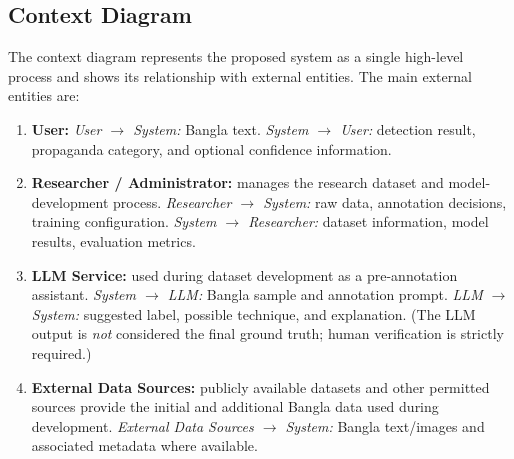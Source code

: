 \subsection{Context Diagram}
The context diagram represents the proposed system as a single high-level process
and shows its relationship with external entities. The main external entities are:
\begin{enumerate}
  \item \textbf{User:} \emph{User $\rightarrow$ System:} Bangla text.
        \emph{System $\rightarrow$ User:} detection result, propaganda category,
        and optional confidence information.
  \item \textbf{Researcher / Administrator:} manages the research dataset and
        model-development process. \emph{Researcher $\rightarrow$ System:} raw
        data, annotation decisions, training configuration.
        \emph{System $\rightarrow$ Researcher:} dataset information, model
        results, evaluation metrics.
  \item \textbf{LLM Service:} used during dataset development as a pre-annotation
        assistant. \emph{System $\rightarrow$ LLM:} Bangla sample and annotation
        prompt. \emph{LLM $\rightarrow$ System:} suggested label, possible
        technique, and explanation. (The LLM output is \emph{not} considered the
        final ground truth; human verification is strictly required.)
  \item \textbf{External Data Sources:} publicly available datasets and other
        permitted sources provide the initial and additional Bangla data used
        during development. \emph{External Data Sources $\rightarrow$ System:}
        Bangla text/images and associated metadata where available.
\end{enumerate}

